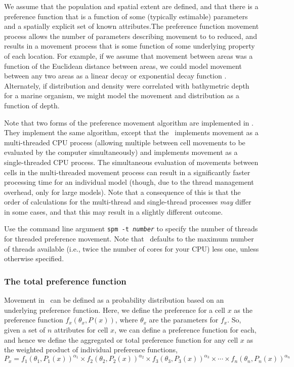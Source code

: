 We assume that the population and spatial extent are defined, and that there is a preference function that is a function of some (typically estimable) parameters and a spatially explicit set of known attributes.The preference function movement process allows the number of parameters describing movement to to reduced, and results in a movement process that is some function of some underlying property of each location. For example, if we assume that movement between areas was a function of the Euclidean distance between areas, we could model movement between any two areas as a linear decay or exponential decay function \citep{1366}. Alternately, if distribution and density were correlated with bathymetric depth for a marine organism, we might model the movement and distribution as a function of depth. 

Note that two forms of the preference movement algorithm are implemented in \SPM. They implement the same algorithm, except that the \ implements movement as a multi-threaded CPU process (allowing multiple between cell movements to be evaluated by the computer simultaneously) and  implements movement as a single-threaded CPU process. The simultaneous evaluation of movements between cells in the multi-threaded movement process can result in a significantly faster processing time for an individual model (though, due to the thread management overhead, only for large models). Note that a consequence of this is that the order of calculations for the multi-thread and single-thread processes \emph{may} differ in some cases, and that this may result in a slightly different outcome.

Use the command line argument \texttt{spm -t \emph{number}} to specify the number of threads for threaded preference movement. Note that \SPM\ defaults to the maximum number of threads available (i.e., twice the number of cores for your CPU) less one, unless otherwise specified. 

\subsubsection*{The total preference function}

Movement in \SPM\ can be defined as a probability distribution based on an underlying preference function. Here, we define the preference for a cell $x$ as the preference function $f_x(\theta_x,P(x))$, where $\theta_x$ are the parameters for $f_x$. So, given a set of $n$ attributes for cell $x$, we can define a preference function for each, and hence we define the aggregated or total preference function for any cell $x$ as the weighted product of individual preference functions,
\begin{equation}
  P_x=f_1(\theta_1,P_1(x))^{\alpha_1} \times f_2(\theta_2,P_2(x))^{\alpha_2} \times f_3(\theta_3,P_3(x))^{\alpha_3} \times \cdots \times f_n(\theta_n,P_n(x))^{\alpha_n}
\end{equation}

